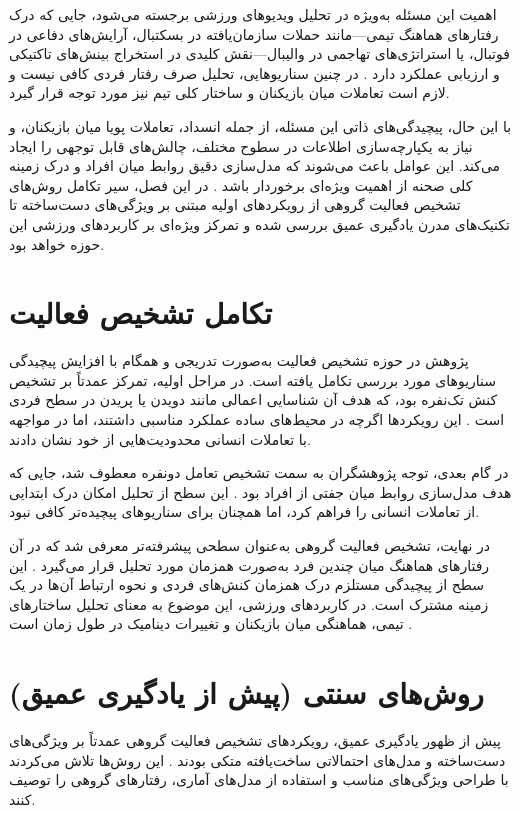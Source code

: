 \documentclass[12pt]{report}
\begin{document}
اهمیت این مسئله به‌ویژه در تحلیل ویدیوهای ورزشی برجسته می‌شود، جایی که درک رفتارهای هماهنگ تیمی—مانند حملات سازمان‌یافته در بسکتبال، آرایش‌های دفاعی در فوتبال، یا استراتژی‌های تهاجمی در والیبال—نقش کلیدی در استخراج بینش‌های تاکتیکی و ارزیابی عملکرد دارد \cite{three,four}. در چنین سناریوهایی، تحلیل صرف رفتار فردی کافی نیست و لازم است تعاملات میان بازیکنان و ساختار کلی تیم نیز مورد توجه قرار گیرد.

با این حال، پیچیدگی‌های ذاتی این مسئله، از جمله انسداد، تعاملات پویا میان بازیکنان، و نیاز به یکپارچه‌سازی اطلاعات در سطوح مختلف، چالش‌های قابل توجهی را ایجاد می‌کند. این عوامل باعث می‌شوند که مدل‌سازی دقیق روابط میان افراد و درک زمینه کلی صحنه از اهمیت ویژه‌ای برخوردار باشد \cite{three,five}. در این فصل، سیر تکامل روش‌های تشخیص فعالیت گروهی از رویکردهای اولیه مبتنی بر ویژگی‌های دست‌ساخته تا تکنیک‌های مدرن یادگیری عمیق بررسی شده و تمرکز ویژه‌ای بر کاربردهای ورزشی این حوزه خواهد بود.


\section{تکامل تشخیص فعالیت}
پژوهش در حوزه تشخیص فعالیت به‌صورت تدریجی و همگام با افزایش پیچیدگی سناریوهای مورد بررسی تکامل یافته است. در مراحل اولیه، تمرکز عمدتاً بر تشخیص کنش تک‌نفره بود، که هدف آن شناسایی اعمالی مانند دویدن یا پریدن در سطح فردی است \cite{six}. این رویکردها اگرچه در محیط‌های ساده عملکرد مناسبی داشتند، اما در مواجهه با تعاملات انسانی محدودیت‌هایی از خود نشان دادند.

در گام بعدی، توجه پژوهشگران به سمت تشخیص تعامل دو‌نفره معطوف شد، جایی که هدف مدل‌سازی روابط میان جفتی از افراد بود \cite{seven}. این سطح از تحلیل امکان درک ابتدایی از تعاملات انسانی را فراهم کرد، اما همچنان برای سناریوهای پیچیده‌تر کافی نبود.

در نهایت، تشخیص فعالیت گروهی به‌عنوان سطحی پیشرفته‌تر معرفی شد که در آن رفتارهای هماهنگ میان چندین فرد به‌صورت همزمان مورد تحلیل قرار می‌گیرد \cite{three}. این سطح از پیچیدگی مستلزم درک همزمان کنش‌های فردی و نحوه ارتباط آن‌ها در یک زمینه مشترک است. در کاربردهای ورزشی، این موضوع به معنای تحلیل ساختارهای تیمی، هماهنگی میان بازیکنان و تغییرات دینامیک در طول زمان است \cite{three,five}.


\section{روش‌های سنتی (پیش از یادگیری عمیق)}
پیش از ظهور یادگیری عمیق، رویکردهای تشخیص فعالیت گروهی عمدتاً بر ویژگی‌های دست‌ساخته و مدل‌های احتمالاتی ساخت‌یافته متکی بودند \cite{eight,nine}. این روش‌ها تلاش می‌کردند با طراحی ویژگی‌های مناسب و استفاده از مدل‌های آماری، رفتارهای گروهی را توصیف کنند.
\end{document}
